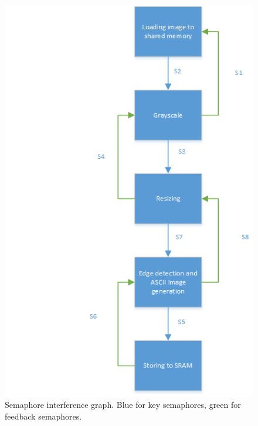 \documentclass[conference]{IEEEtran}
\begin{document}
\begin{figure}
	\centering
	\includegraphics[scale=0.8]{sync.png}
	\caption{Semaphore interference graph. Blue for key semaphores, green for feedback semaphores.}
	\label{fg:sync}
\end{figure}
\end{document}
